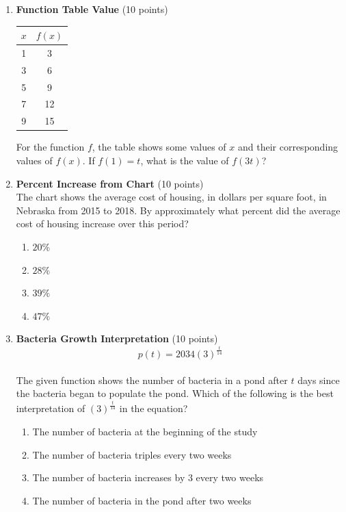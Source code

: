 \begin{enumerate}
  \item \textbf{Function Table Value} (10 points)\\
  \begin{table}[h!]
  \centering
  \renewcommand{\arraystretch}{1.3}
  \setlength{\tabcolsep}{16pt}
  \begin{tabular}{|c|c|}
  \hline $x$ & $f(x)$ \\
  \hline 1 & 3 \\
  \hline 3 & 6 \\
  \hline 5 & 9 \\
  \hline 7 & 12 \\
  \hline 9 & 15 \\
  \hline
  \end{tabular}
  \end{table}
  For the function $f$, the table shows some values of $x$ and their corresponding values of $f(x)$. If $f(1)=t$, what is the value of $f(3t)$?
  \begin{subanswer}
  \end{subanswer}

  \item \textbf{Percent Increase from Chart} (10 points)\\
  The chart shows the average cost of housing, in dollars per square foot, in Nebraska from 2015 to 2018. By approximately what percent did the average cost of housing increase over this period?
  \begin{enumerate}[label=\Alph*.]
    \item $20\%$
    \item $28\%$
    \item $39\%$
    \item $47\%$
  \end{enumerate}
  \begin{subanswer}
  \end{subanswer}

  \newpage

  \item \textbf{Bacteria Growth Interpretation} (10 points)\\
  $$p(t)=2034(3)^{\frac{t}{14}}$$\\
  The given function shows the number of bacteria in a pond after $t$ days since the bacteria began to populate the pond. Which of the following is the best interpretation of $(3)^{\frac{t}{14}}$ in the equation?
  \begin{enumerate}[label=\Alph*.]
    \item The number of bacteria at the beginning of the study
    \item The number of bacteria triples every two weeks
    \item The number of bacteria increases by 3 every two weeks
    \item The number of bacteria in the pond after two weeks
  \end{enumerate}
  \begin{subanswer}
  \end{subanswer}


\end{enumerate}
